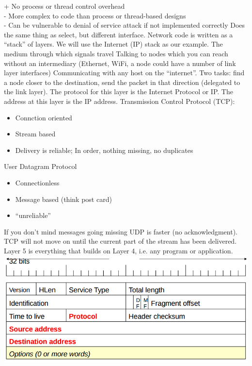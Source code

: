 \documentclass[number]{notes}
\begin{document}
\begin{landscape}
\begin{multicols}{3}
+ No process or thread control overhead\\
- More complex to code than process or thread-based designs\\
- Can be vulnerable to denial of service attack if not implemented correctly
Does the same thing as select, but different interface.
Network code is written as a ``stack'' of layers. We will use the Internet (IP) stack as our example.
The medium through which signals travel
Talking to nodes which you can reach without an intermediary (Ethernet, WiFi, a node could have a number of link layer interfaces)
Communicating with any host on the ``internet''. Two tasks: find a node closer to the destination, send the packet in that direction (delegated to the link layer). The protocol for this layer is the Internet Protocol or IP. The address at this layer is the IP address.
Transmission Control Protocol (TCP):
\begin{itemize}[nolistsep]
    \item Connction oriented
    \item Stream based
    \item Delivery is reliable; In order, nothing missing, no duplicates
\end{itemize}
User Datagram Protocol
\begin{itemize}[nolistsep]
    \item Connectionless
    \item Message based (think post card)
    \item ``unreliable''
\end{itemize}
If you don't mind messages going missing UDP is faster (no acknowledgment). TCP will not move on until the current part of the stream has been delivered.
Layer 5 is everything that builds on Layer 4, i.e. any program or application.
\includegraphics[width=\linewidth]{header.png}

\end{multicols}
\end{landscape}
\end{document}
